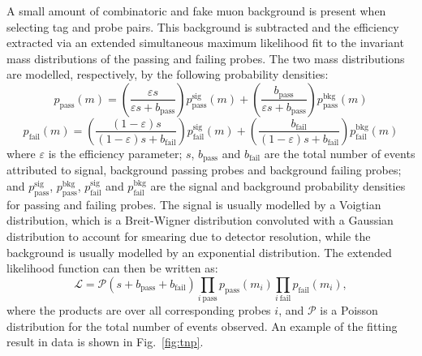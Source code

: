A small amount of combinatoric and fake muon background is present when 
selecting tag and probe pairs.
This background is subtracted and the efficiency extracted via an extended 
simultaneous maximum likelihood fit to the invariant mass distributions of the 
passing and failing probes. The two mass distributions are modelled, 
respectively, by the following probability densities:
\begin{equation}
p_{\mathrm{pass}}(m) = \left(\frac{\varepsilon s}{\varepsilon s + 
b_{\mathrm{pass}}}\right) p_{\mathrm{pass}}^{\mathrm{sig}}(m) + 
\left(\frac{b_{\mathrm{pass}}}{\varepsilon s + b_{\mathrm{pass}}}\right) 
p_{\mathrm{pass}}^{\mathrm{bkg}}(m)
\end{equation}
\begin{equation}
p_{\mathrm{fail}}(m) = \left(\frac{(1 - \varepsilon )s}{(1 - \varepsilon)s + 
b_{\mathrm{fail}}}\right) p_{\mathrm{fail}}^{\mathrm{sig}}(m) + 
\left(\frac{b_{\mathrm{fail}}}{(1 - \varepsilon)s + b_{\mathrm{fail}}}\right) 
p_{\mathrm{fail}}^{\mathrm{bkg}}(m)
\end{equation}
where $\varepsilon$ is the efficiency parameter; $s$, $b_{\mathrm{pass}}$ and 
$b_{\mathrm{fail}}$ are the total number of 
events attributed to signal, background passing probes and background failing 
probes; and $p_{\mathrm{pass}}^{\mathrm{sig}}$, 
$p_{\mathrm{pass}}^{\mathrm{bkg}}$, $p_{\mathrm{fail}}^{\mathrm{sig}}$ and 
$p_{\mathrm{fail}}^{\mathrm{bkg}}$ are the signal and background probability 
densities for passing and failing probes. The signal is usually modelled by a 
Voigtian distribution, which is a Breit-Wigner distribution convoluted with a 
Gaussian distribution to account for smearing due to detector resolution, while 
the background is usually modelled by an exponential distribution.
The extended likelihood function can then be written as:
\begin{equation}
\mathcal{L} = \mathcal{P}(s + b_{\mathrm{pass}} + b_{\mathrm{fail}})  
\prod_{i~\mathrm{pass}} p_{\mathrm{pass}}(m_i) \prod_{i~\mathrm{fail}} 
p_{\mathrm{fail}}(m_i), 
\end{equation}
where the products are over all corresponding probes $i$, and $\mathcal{P}$ is 
a Poisson distribution for the total number of events observed.
An example of the fitting result in data is shown in Fig.~\ref{fig:tnp}.

